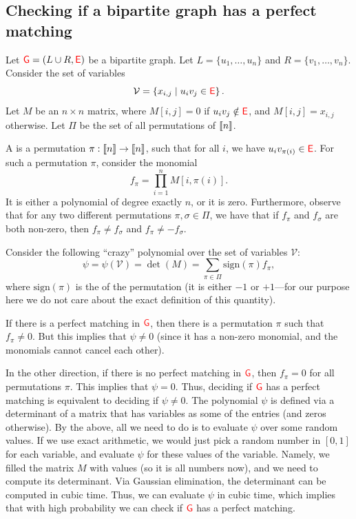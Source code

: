 \subsection{Checking if a bipartite graph has a perfect matching}

Let ${\textcolor{red}{\mathsf{G}}} =(L\cup R,{\textcolor{red}{\mathsf{E}}})$ be a bipartite graph. Let $L = \{ u_1, \ldots,
u_n\}$ and $R= \{v_1,\ldots, v_n\}$. Consider the set of variables
\begin{equation*}
    \mathcal{V} =\left\{ x_{i,j} \;\middle\vert\; u_i v_j \in {\textcolor{red}{\mathsf{E}}} \right\}.
\end{equation*}
Let $M$ be an $n \times n$ matrix, where $M[i,j]=0$ if
$u_iv_j \notin {\textcolor{red}{\mathsf{E}}}$, and $M[i,j] = x_{i,j}$ otherwise.  Let $\Pi$
be the set of all permutations of $\left\llbracket n \right\rrbracket$.

A  is a permutation
$\pi:\left\llbracket n \right\rrbracket\rightarrow \left\llbracket n \right\rrbracket$, such that for all $i$, we have
$u_i v_{\pi(i)} \in {\textcolor{red}{\mathsf{E}}}$. For such a permutation $\pi$, consider
the monomial
\begin{equation*}
    f_\pi = \prod_{i=1}^n M[i,\pi(i)].
\end{equation*}
It is either a polynomial of degree exactly $n$, or it is
zero. Furthermore, observe that for any two different permutations
$\pi,\sigma \in \Pi$, we have that if $f_\pi$ and $f_\sigma$ are both non-zero, then
$f_\pi \neq f_\sigma$ and $f_\pi \neq -f_\sigma$.


Consider the following ``crazy'' polynomial over the set of variables
$\mathcal{V}$:
\begin{equation*}
    \psi  =
    \psi( \mathcal{V})%
    =%
    \det(M)
    =%
    \sum_{\pi \in \Pi}
    \mathrm{sign}(\pi) f_\pi,
\end{equation*}
where $\mathrm{sign}(\pi)$ is the  of the permutation (it is
either $-1$ or $+1$---for our purpose here we do not care about the exact
definition of this quantity).

If there is a perfect matching in ${\textcolor{red}{\mathsf{G}}}$, then there is a permutation
$\pi$ such that $f_\pi \neq 0$. But this implies that $\psi \neq 0$
(since it has a non-zero monomial, and the monomials cannot cancel
each other).

In the other direction, if there is no perfect matching in ${\textcolor{red}{\mathsf{G}}}$, then
$f_\pi = 0$ for all permutations $\pi$. This implies that
$\psi=0$. Thus, deciding if ${\textcolor{red}{\mathsf{G}}}$ has a perfect matching is equivalent
to deciding if $\psi \neq 0$. The polynomial $\psi$ is defined via a
determinant of a matrix that has variables as some of the entries (and
zeros otherwise). By the above, all we need to do is to evaluate
$\psi$ over some random values. If we use exact arithmetic, we would
just pick a random number in $[0,1]$ for each variable, and evaluate
$\psi$ for these values of the variable.  Namely, we filled the matrix
$M$ with values (so it is all numbers now), and we need to compute
its determinant. Via Gaussian elimination, the determinant can be
computed in cubic time. Thus, we can evaluate $\psi$ in cubic time,
which implies that with high probability we can check if ${\textcolor{red}{\mathsf{G}}}$ has a
perfect matching.

